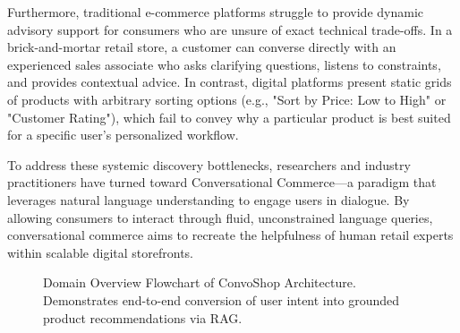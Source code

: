\documentclass[12pt,a4paper]{article}
\begin{document}
Furthermore, traditional e-commerce platforms struggle to provide dynamic advisory support for consumers who are unsure of exact technical trade-offs. In a brick-and-mortar retail store, a customer can converse directly with an experienced sales associate who asks clarifying questions, listens to constraints, and provides contextual advice. In contrast, digital platforms present static grids of products with arbitrary sorting options (e.g., "Sort by Price: Low to High" or "Customer Rating"), which fail to convey why a particular product is best suited for a specific user's personalized workflow.

To address these systemic discovery bottlenecks, researchers and industry practitioners have turned toward Conversational Commerce—a paradigm that leverages natural language understanding to engage users in dialogue. By allowing consumers to interact through fluid, unconstrained language queries, conversational commerce aims to recreate the helpfulness of human retail experts within scalable digital storefronts.

\begin{figure}[h]
\centering
{}
\caption{Domain Overview Flowchart of ConvoShop Architecture. Demonstrates end-to-end conversion of user intent into grounded product recommendations via RAG.}
\label{fig:1_1}
\end{figure}
\end{document}
